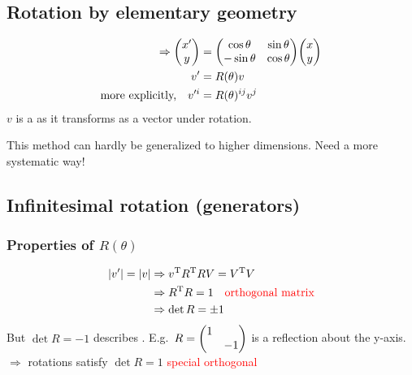 \documentclass[11pt,fleqn]{book} %
\begin{document}
\subsection{Rotation by elementary geometry}
\begin{figure}[h]
\centering
\end{figure}
\begin{align*}
  \Rightarrow \mqty(x' \\ y) &= \mqty(\cos \theta & \sin \theta \\ -\sin \theta & \cos \theta\\) \mqty(x \\ y) \\
  v' &= R(\theta) v \\
  \text{more explicitly,\quad} v'^i &= R(\theta)^{ij} v^j
\end{align*}
\(v\) is a  as it transforms as a vector under rotation.
\begin{remark}
  This method can hardly be generalized to higher dimensions. Need a more
  systematic way!
\end{remark}

\subsection{Infinitesimal rotation (generators)}

\subsubsection{Properties of \(R(\theta)\)}
\begin{align*}
  \abs{v'} = \abs{v} &\Rightarrow v^{\mathrm{T}} R^{\mathrm{T}} R V = V^{\mathrm{T}} V \\
                     &\Rightarrow R^{\mathrm{T}} R = 1 \quad \text{\textcolor{red}{orthogonal matrix}}\\
                     &\Rightarrow \det R = \pm 1
\end{align*}
But \(\det R = -1\) describes . E.g.\ \(R=\mqty(\dmat{1, -1})\) is a reflection about the y-axis. \\
\(\Rightarrow\) rotations satisfy \(\det R = 1\) \quad \textcolor{red}{special orthogonal}
\end{document}
